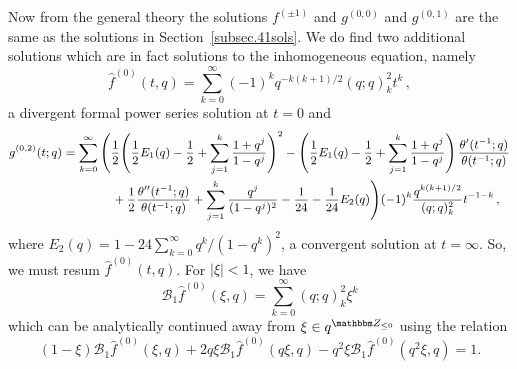\documentclass[12pt,reqno]{amsart}
\theoremstyle{definition}
\def\BZ{\mathbbm Z}
\def\be{\begin{equation}}
\def\ee{\end{equation}}
\def\Bor{\mathcal{B}}
\begin{document}
\noindent
Now from the general theory the solutions $f^{(\pm1)}$ and $g^{(0,0)}$ and
$g^{(0,1)}$ are the same as the solutions in Section~\ref{subsec.41sols}. We do
find two additional
solutions which are in fact solutions to the inhomogeneous equation, namely
\be
\hat{f}^{(0)}(t,q)=\sum_{k=0}^{\infty}(-1)^{k}q^{-k(k+1)/2}(q;q)_{k}^{2}t^{k} \,,
\ee
a divergent formal power series solution at $t=0$ and
\be
\label{g2}
{\small
\begin{aligned}
g^{(0,2)}(t;q)
&=
\sum_{k=0}^{\infty}\left(\frac{1}{2}\Bigg(\frac{1}{2}E_{1}(q)-\frac{1}{2}+\sum_{j=1}^{k}\frac{1+q^{j}}{1-q^{j}}\right)^{2}
  -\left(\frac{1}{2}E_{1}(q)-\frac{1}{2}+\sum_{j=1}^{k}\frac{1+q^{j}}{1-q^{j}}\right)\frac{\theta'(t^{-1};q)}{\theta(t^{-1};q)}\\
  &\qquad\qquad+\frac{1}{2}\frac{\theta''(t^{-1};q)}{\theta(t^{-1};q)}
  +\sum_{j=1}^{k}\frac{q^{j}}{(1-q^{j})^2}-\frac{1}{24}-\frac{1}{24}E_{2}(q)\Bigg)
(-1)^{k}\frac{q^{k(k+1)/2}}{(q;q)_{k}^{2}}t^{-1-k}\,,
\end{aligned}
}
\ee
where $E_{2}(q)=1-24\sum_{k=0}^{\infty}q^{k}/(1-q^{k})^2$,
a convergent solution at $t=\infty$. So, we must resum $\hat{f}^{(0)}(t,q)$. For $|\xi|<1$, we have
\be
\Bor_{1}\hat{f}^{(0)}(\xi,q)
=
\sum_{k=0}^{\infty}(q;q)_{k}^{2}\xi^{k}
\ee
which can be analytically continued away from $\xi\in q^{\BZ_{\leq0}}$ using the
relation
\be
(1-\xi)\Bor_{1}\hat{f}^{(0)}(\xi,q)+2q\xi \Bor_{1}\hat{f}^{(0)}(q\xi,q)
-q^2\xi \Bor_{1}\hat{f}^{(0)}(q^{2}\xi,q) = 1.
\ee
\begin{center}
\end{center}
\end{document}
